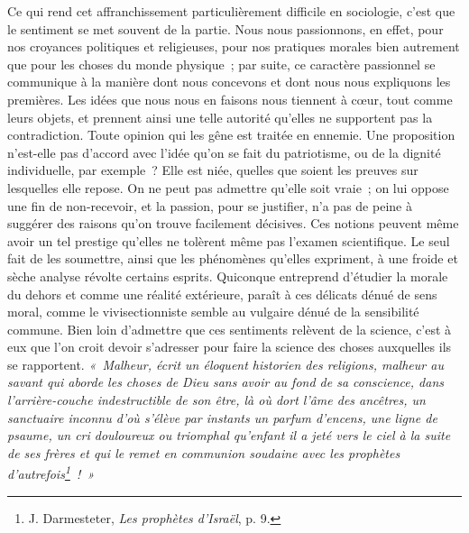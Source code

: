 \documentclass[french,twoside]{book} %
\begin{document}
Ce qui rend cet affranchissement particulièrement difficile en sociologie, c’est que le sentiment se met souvent de la partie. Nous nous passionnons, en effet, pour nos croyances politiques et religieuses, pour nos pratiques morales bien autrement que pour les choses du monde physique ; par suite, ce caractère passionnel se communique à la manière dont nous concevons et dont nous nous expliquons les premières. Les idées que nous nous en faisons nous tiennent à cœur, tout comme leurs objets, et prennent ainsi une telle autorité qu’elles ne supportent pas la contradiction. Toute opinion qui les gêne est traitée en ennemie. Une proposition n’est-elle pas d’accord avec l’idée qu’on se fait du patriotisme, ou de la dignité individuelle, par exemple ? Elle est niée, quelles que soient les preuves sur lesquelles elle repose. On ne peut pas admettre qu’elle soit vraie ; on lui oppose une fin de non-recevoir, et la passion, pour se justifier, n’a pas de peine à suggérer des raisons qu’on trouve facilement décisives. Ces notions peuvent même avoir un tel prestige qu’elles ne tolèrent même pas l’examen scientifique. Le seul fait de les soumettre, ainsi que les phénomènes qu’elles expriment, à une froide et sèche analyse révolte certains esprits. Quiconque entreprend d’étudier la morale du dehors et comme une réalité extérieure, paraît à ces délicats dénué de sens moral, comme le vivisectionniste semble au vulgaire dénué de la sensibilité commune. Bien loin d’admettre que ces sentiments relèvent de la science, c’est à eux que l’on croit devoir s’adresser pour faire la science des choses auxquelles ils se rapportent. \emph{« Malheur, écrit un éloquent historien des religions, malheur au savant qui aborde les choses de Dieu sans avoir au fond de sa conscience, dans l’arrière-couche indestructible de son être, là où dort l’âme des ancêtres, un sanctuaire inconnu d’où s’élève par instants un parfum d’encens, une ligne de psaume, un cri douloureux ou triomphal qu’enfant il a jeté vers le ciel à la suite de ses frères et qui le remet en communion soudaine avec les prophètes d’autrefois\footnote{ J. Darmesteter, \emph{Les prophètes d’Israël}, p. 9.} ! »}\par
\end{document}
